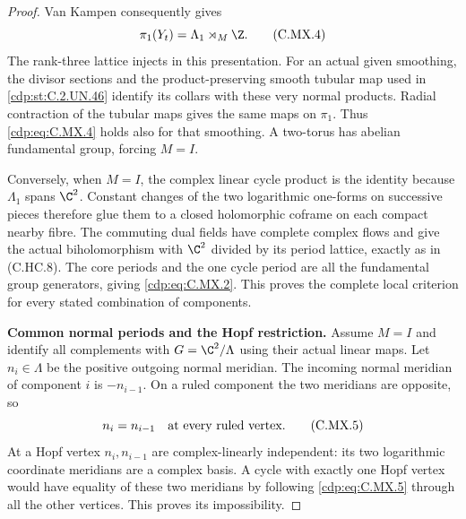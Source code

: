 \begin{proof}
Van Kampen consequently gives
\[
                        \pi_1(Y_t)=\Lambda_1\rtimes_M\Z .
                                                        \tag{C.MX.4}\label{cdp:eq:C.MX.4}
\]
The rank-three lattice injects in this presentation.
For an actual given smoothing, the divisor sections
and the product-preserving smooth tubular map used
in \ref{cdp:st:C.2.UN.46} identify its collars with these very normal
products. Radial contraction of the tubular maps
gives the same maps on $\pi_1$. Thus \eqref{cdp:eq:C.MX.4} holds
also for that smoothing. A two-torus has abelian
fundamental group, forcing $M=I$.

Conversely, when $M=I$, the complex linear cycle
product is the identity because $\Lambda_1$
spans $\C^2$. Constant changes of the two logarithmic
one-forms on successive pieces therefore glue them
to a closed holomorphic coframe on each compact
nearby fibre. The commuting dual fields have
complete complex flows and give the actual
biholomorphism with $\C^2$ divided by its period
lattice, exactly as in (C.HC.8). The core periods
and the one cycle period are all the fundamental
group generators, giving \eqref{cdp:eq:C.MX.2}. This proves
the complete local criterion for every stated
combination of components.

\par\medskip\noindent\textbf{Common normal periods and the Hopf restriction.}
Assume $M=I$ and identify all complements with
$G=\C^2/\Lambda$ using their actual linear maps.
Let $n_i\in\Lambda$ be the positive outgoing normal
meridian. The incoming normal meridian of component
$i$ is $-n_{i-1}$. On a ruled component the two
meridians are opposite, so
\[
                      n_i=n_{i-1}
                  \quad\hbox{at every ruled vertex}.   \tag{C.MX.5}\label{cdp:eq:C.MX.5}
\]
At a Hopf vertex $n_i,n_{i-1}$ are complex-linearly
independent: its two logarithmic coordinate
meridians are a complex basis. A cycle with
exactly one Hopf vertex would have equality of
these two meridians by following \eqref{cdp:eq:C.MX.5} through
all the other vertices. This proves its impossibility.


\end{proof}
